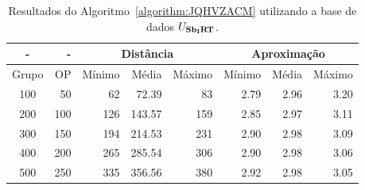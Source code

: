\begin{table}[!htb]
  \caption{Resultados do Algoritmo~\ref{algorithm:JQHVZACM} utilizando a base de dados $U_{\textbf{Sb\textsubscript{I}RT}}{}$.}
  \label{table:NKWIXQRV}
  \centering
  \begin{tabular}{|c|r|r|r|r|r|r|r|}
    \hline
      -      &  -   & \multicolumn{3}{c|}{Distância}             & \multicolumn{3}{c|}{Aproximação}           \\ \hline
    Grupo    & OP   & Mínimo       & Média        & Máximo       & Mínimo       & Média        & Máximo       \\ \hline  
    100      & 50   & 62           &  72.39       &  83          & 2.79         & 2.96         & 3.20         \\ \hline
    200      & 100  & 126          & 143.57       & 159          & 2.85         & 2.97         & 3.11         \\ \hline
    300      & 150  & 194          & 214.53       & 231          & 2.90         & 2.98         & 3.09         \\ \hline
    400      & 200  & 265          & 285.54       & 306          & 2.90         & 2.98         & 3.06         \\ \hline
    500      & 250  & 335          & 356.56       & 380          & 2.92         & 2.98         & 3.05         \\ \hline    
  \end{tabular}
\end{table}